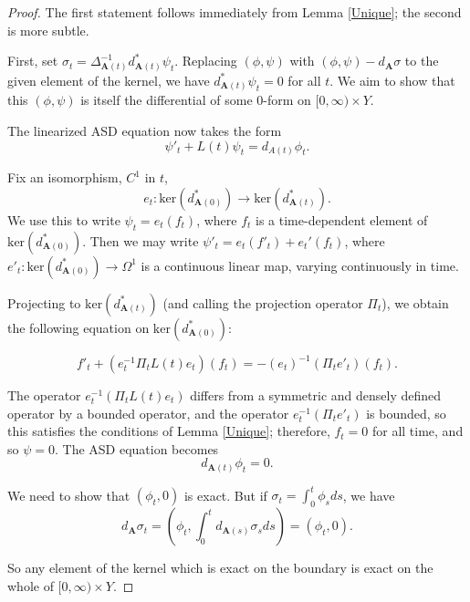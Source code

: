 \documentclass{memo-l}
\theoremstyle{definition}
\theoremstyle{remark}
\numberwithin{section}{chapter}
\numberwithin{equation}{chapter}
\begin{document}
\begin{proof}
The first statement follows immediately from Lemma \ref{Unique}; the second is more subtle. 

First, set $\sigma_t = \Delta_{\mathbf{A}(t)}^{-1}d_{\mathbf{A}(t)}^*\psi_t$. Replacing $(\phi, \psi)$ with $(\phi, \psi) - d_{\mathbf{A}} \sigma$ to the given element of the kernel, we have $d_{\mathbf{A}(t)}^* \psi_t = 0$ for all $t$. We aim to show that this $(\phi, \psi)$ is itself the differential of some 0-form on $[0,\infty) \times Y$. 

The linearized ASD equation now takes the form 
$$\psi'_t + L(t)\psi_t = d_{A(t)}\phi_t.$$ 

Fix an isomorphism, $C^1$ in $t$, $$e_t: \text{ker}(d_{\mathbf{A}(0)}^*) \to \text{ker}(d_{\mathbf{A}(t)}^*).$$ We use this to write $\psi_t = e_t(f_t)$, where $f_t$ is a time-dependent element of $\text{ker}(d_{\mathbf{A}(0)}^*)$. Then we may write $\psi'_t = e_t(f'_t) + e_t'(f_t)$, where $e'_t: \text{ker}(d_{\mathbf{A}(0)}^*) \to \Omega^1$ is a continuous linear map, varying continuously in time. 

Projecting to $\text{ker}(d_{\mathbf{A}(t)}^*)$ (and calling the projection operator $\Pi_t$), we obtain the following equation on $\text{ker}(d_{\mathbf{A}(0)}^*)$:

$$f'_t + (e_t^{-1}\Pi_t L(t) e_t)(f_t) = -(e_t)^{-1}(\Pi_t e'_t)(f_t).$$

The operator $e_t^{-1} (\Pi_t L(t) e_t)$ differs from a symmetric and densely defined operator by a bounded operator, and the operator $e_t^{-1}(\Pi_t e'_t)$ is bounded, so this satisfies the conditions of Lemma \ref{Unique}; therefore, $f_t = 0$ for all time, and so $\psi = 0$. The ASD equation becomes 
$$d_{\mathbf{A}(t)} \phi_t = 0.$$ 

We need to show that $(\phi_t, 0)$ is exact. But if $\sigma_t = \int_0^t \phi_s ds$, we have 
$$d_{\mathbf{A}} \sigma_t = (\phi_t, \int_0^t d_{\mathbf{A}(s)} \sigma_s ds) = (\phi_t, 0).$$ 

So any element of the kernel which is exact on the boundary is exact on the whole of $[0,\infty) \times Y$. 
\end{proof}
\end{document}
